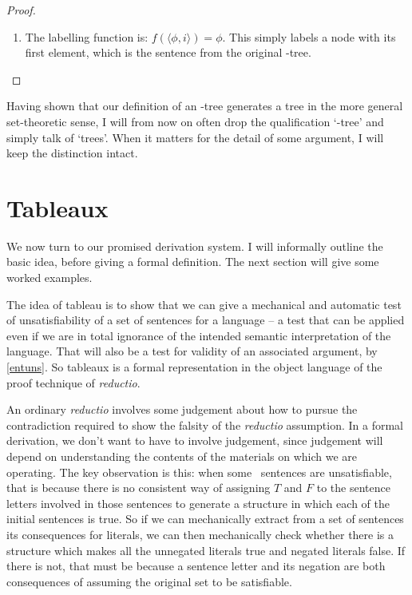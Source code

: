 \begin{theorem}
\begin{proof}
\begin{enumerate}
			\item The labelling function is: $f(\langle \phi,i\rangle) = \phi$. This simply labels a node with its first element, which is the sentence from the original \lone-tree.			
		\end{enumerate}
	\end{proof}
\end{theorem}
Having shown that our definition of an \lone-tree generates a tree in the more general set-theoretic sense, I will from now on often  drop the qualification `\lone-tree' and simply talk of `trees'. When it matters for the detail of some argument, I will keep the distinction intact. 

\section{Tableaux}

We now turn to our promised derivation system. I will informally outline the basic idea, before giving a formal definition. The next section will give some worked examples.

The idea of tableau is to show that we can give a mechanical and automatic test of unsatisfiability of a set of sentences for a language – a test that can be applied even if we are in total ignorance of the intended semantic interpretation of the language. That will also be a test for validity of an associated argument, by \autoref{entuns}. So tableaux is a formal representation in the object language of the proof technique of \emph{reductio}. 

An ordinary \emph{reductio} involves some judgement about how to pursue the contradiction required to show the falsity of the \emph{reductio} assumption. In a formal derivation, we don't want to have to involve judgement, since judgement will depend on understanding the contents of the materials on which we are operating. The key observation is this: when some \lone\ sentences are unsatisfiable, that is because there is no consistent way of assigning $T$ and $F$ to the sentence letters involved in those sentences to generate a structure in which each of the initial sentences is true. So if we can mechanically extract from a set of sentences its consequences for literals, we can then mechanically check whether there is a structure which makes all the unnegated literals true and negated literals false. If there is not, that must be because a sentence letter and its negation are both consequences of assuming the original set to be satisfiable.


